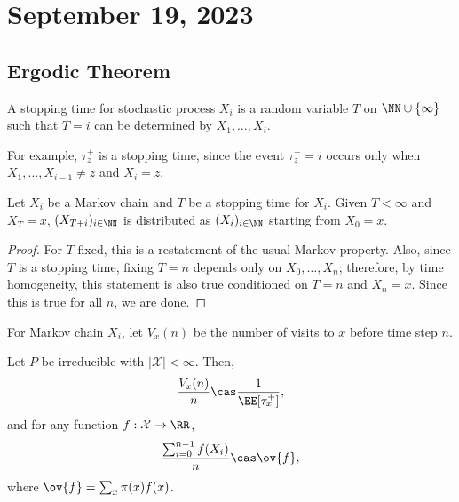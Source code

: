 \section{September 19, 2023}

\subsection{Ergodic Theorem}

\begin{definition}

A \ac{stopping time} for stochastic process $X_i$ is a random variable $T$ on $\NN\cup \{\infty\}$ such that $T=i$ can be determined by $X_1, \hdots, X_i$. 
\end{definition}

For example, $\tau_z^+$ is a stopping time, since the event $\tau_z^+=i$ occurs only when $X_1, \hdots, X_{i-1}\neq z$ and $X_i = z$. 

\begin{theorem}

Let $X_i$ be a Markov chain and $T$ be a stopping time for $X_i$. Given $T<\infty$ and $X_T=x$, $(X_{T+i})_{i\in \NN}$ is distributed as $(X_i)_{i\in \NN}$ starting from $X_0=x$.
\end{theorem}

\begin{proof}
For $T$ fixed, this is a restatement of the usual Markov property. Also, since $T$ is a stopping time, fixing $T=n$ depends only on $X_0, \hdots, X_{n}$; therefore, by time homogeneity, this statement is also true conditioned on $T=n$ and $X_n=x$. Since this is true for all $n$, we are done. 
\end{proof}

For Markov chain $X_i$, let $V_x(n)$ be the number of visits to $x$ before time step $n$. 

\begin{theorem}

Let $P$ be irreducible with $\vert \mathcal{X}\vert < \infty$. Then, 
\[\frac{V_x(n)}{n}\cas \frac{1}{\EE[\tau_x^+]},\]
and for any function $f: \mathcal{X}\rightarrow \RR$, 
\[\frac{\sum_{i=0}^{n-1}f(X_i)}{n}\cas \ov{f},\]
where $\ov{f} = \sum_x \pi(x)f(x)$.
\end{theorem}

